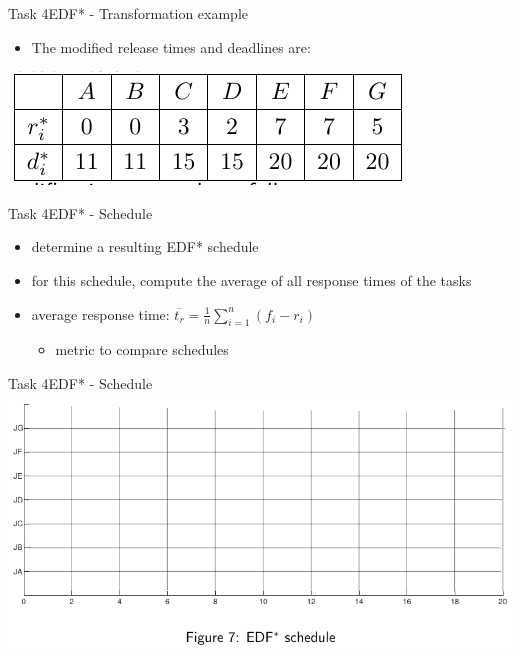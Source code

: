 \begin{frame}{Task 4}{EDF* - Transformation example}
  \begin{itemize}
    \item The modified \alert{release times} and \alert{deadlines} are:
  \end{itemize}
  \centering
 \includegraphics[height=0.2\paperheight]{./figures/4_tab.png}
\end{frame}

\begin{frame}[allowframebreaks]{Task 4}{EDF* - Schedule}
  \begin{tasknoinc}
    \begin{itemize}
      \item determine a resulting EDF* schedule
      \item for this schedule, compute the \alert{average of all response times} of the tasks
    \end{itemize}
  \end{tasknoinc}
  \begin{requirementsnoinc}
    \begin{itemize}
      \item \alert{average response time:} $\displaystyle \overline{t_r}=\frac{1}{n} \sum_{i=1}^n\left(f_i-r_i\right)$
      \begin{itemize}
        \item metric to \alert{compare schedules}
      \end{itemize}
    \end{itemize}
  \end{requirementsnoinc}
\end{frame}

\begin{frame}{Task 4}{EDF* - Schedule}
    \includegraphics[width = 0.9\linewidth]{figures/EDF-star-schedule.png}
\end{frame}

